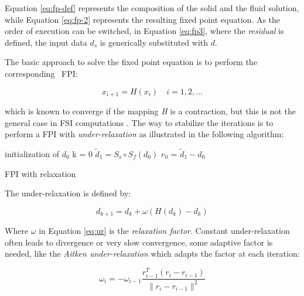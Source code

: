 Equation \ref{eq:fp-def} represents the composition of the solid and the fluid solution, while Equation \ref{eq:fp-2} represents the resulting fixed point equation. As the order of execution can be switched, in Equation \ref{eq:fp3}, where the \textit{residual} is defined, the input data $d_s$ is generically substituted with $d$.

The basic approach to solve the fixed point equation is to perform the corresponding ~\ac{FPI}:

\begin{equation}
	x_{i+1} = H(x_i) \quad i=1,2,\ldots
\end{equation} 

which is known to converge if the mapping \textit{H} is a contraction, but this is not the general case in FSI computations \cite{mehl2016parallel}. The way to stabilize the iterations is to perform a FPI with \textit{under-relaxation} as illustrated in the following algorithm:

\begin{algorithm}[H]
	\SetAlgoLined
	initialization of $d_0$\;
	k = 0\;
	$\tilde{d}_1 = S_s \circ S_f(d_0)$\;
	$r_0$ = $\tilde{d}_1 - d_0$\;
	\caption{FPI with relaxation}
\end{algorithm}

The under-relaxation is defined by:

\begin{equation}
	d_{k+1} = d_{k} + \omega \left( H(d_k)  - d_k  \right)
	\label{eq:ur}
\end{equation} 

Where $\omega$ in Equation \ref{eq:ur} is the \textit{relaxation factor}. Constant under-relaxation often leads to divergence or very slow convergence, some adaptive factor is needed, like the \textit{Aitken under-relaxation} \cite{irons1969version} which adapts the factor at each iteration:

\begin{equation}
	\omega_i = -\omega_{i-1} \frac{r_{i-1}^T \left(r_i - r_{i-1}\right)}{ \lVert r_i - r_{i-1} \rVert ^2}
\end{equation}




























